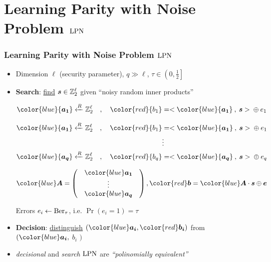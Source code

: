 \section{Learning Parity with Noise Problem $\mathrm{LPN}$}

\begin{frame}
\frametitle{Learning Parity with Noise Problem $\mathrm{LPN}$}
\begin{itemize}[<+->]
 \item Dimension $\ell$ (security parameter), $q \gg \ell$, $\tau \in \left( 0,\frac{1}{2} \right]$
 \vspace*{5pt}
 \item \textbf{Search}: \underline{find}  $ \boldsymbol{s} \in \mathbb{Z}_2^{\ell}$ given ``noisy random inner products'' \\
 \begin{overprint}
 \begin{align*}
  {\color{blue}{\vect{a_1}}} \R \zol \quad , \quad {\color{red}{b_1}} &= <{\color{blue}{\vect{a_1}}} \: , \: \vect{s}> \: \xor \: e_1 \\  
  \end{align*}

  \begin{align*}
  {\color{blue}{\vect{a_1}}} \R \zol \quad , \quad {\color{red}{b_1}} &= <{\color{blue}{\vect{a_1}}} \: , \: \vect{s}> \: \xor \: e_1 \\
   & \vdots \\
   {\color{blue}{\vect{a_q}}} \R \zol \quad, \quad  {\color{red}{b_q}} &= <{\color{blue}{\vect{a_q}}} \: , \: \vect{s}> \: \xor \: e_q \\
  \end{align*}

  \vspace*{15pt}
\[
{\color{blue} \vect{A}} = \begin{pmatrix}
            & {\color{blue}\vect{a_1}} & \\
            & \vdots  & \\ 
            & {\color{blue}\vect{a_q}} & 
           \end{pmatrix}  , {\color{red} \vect{b}} = {\color{blue} \vect{A}} \cdot \vect{s} \xor \vect{e} 
\]
 \end{overprint}
  Errors $e_i \gets \mathrm{Ber}_{\tau}$, i.e. $\Pr(e_i=1)= \tau$
\end{itemize}
\vspace{5pt}

  \begin{itemize}
    \item<5-> \textbf{Decision}: \underline{distinguish} $\left( {\color{blue}\vect{a_i}}, {\color{red}\vect{b_i}} \right)$ from {\color{blue}{uniform}} $( {\color{blue}\vect{a_i}}, $ {\color{blue} $b_i$} $)$ 
\vspace{5pt}
    \item<6-> \emph{decisional} and \emph{search} $\mathrm{LPN}$ are \emph{``polinomially equivalent''} \\ 
 \end{itemize}
\end{frame}

